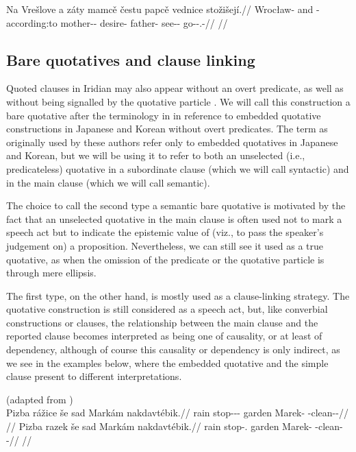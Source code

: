 \pex
\begingl
  \gla Na Vrešlove a záty mamcě čestu papcě vednice stožišejí.//
  \glb \Loc{} Wrocław-\Acc{} and \Neg{}-according:to mother-\Dim{}-\Gen{} desire-\Ins{} father-\Gen{} see-\Pv{}-\SupP{} go-\Av{}-\Subj{}.\Pf{}-\Quot{}//
  \glft {}//
\endgl
\xe


\subsection{Bare quotatives and clause linking}

Quoted clauses in Iridian may also appear without an overt predicate, as well as
without being signalled by the quotative particle . We will call this
construction a {\sc bare quotative} after the terminology in
\textcite{tomioka2019} in reference to embedded quotative constructions in
Japanese and Korean without overt predicates. The term as originally used by
these authors refer only to embedded quotatives in Japanese and Korean, but we
will be using it to refer to both an unselected (i.e., predicateless) quotative
in a subordinate clause (which we will call {\sc syntactic}) and in the main
clause (which we will call {\sc semantic}).

The choice to call the second type a semantic bare quotative is motivated by the
fact that an unselected quotative in the main clause is often used not to mark a
speech act but to indicate the epistemic value of (viz., to pass the speaker's
judgement on) a proposition. Nevertheless, we can still see it used as a true
quotative, as when the omission of the predicate or the quotative particle is
through mere ellipsis.

The first type, on the other hand, is mostly used as a clause-linking strategy.
The quotative construction is still considered as a speech act, but, like
converbial constructions or  clauses, the relationship between the main
clause and the reported clause becomes interpreted as being one of causality, or
at least of dependency, although of course this causality or dependency is only
indirect, as we see in the examples below, where the embedded quotative and the
simple  clause present to different interpretations.

\pex
  \a(adapted from \cite[3]{tomioka2019})\\
  \begingl
    \gla Pizba rážice še sad Markám nakdavtébik.//
    \glb rain stop-\Av{}-\Pf{}-\Quot{} \Com{} garden Marek-\Agt{} \Incp{}-clean-\Ben{}-\Pf{}//
    \glft {}//
  \endgl
  \a\begingl
    \gla Pizba razek še sad Markám nakdavtébik.//
    \glb rain stop-\Av{}.\Pf{} \Com{} garden Marek-\Agt{} \Incp{}-clean-\Ben{}-\Pf{}//
    \glft {}//
  \endgl
\xe


